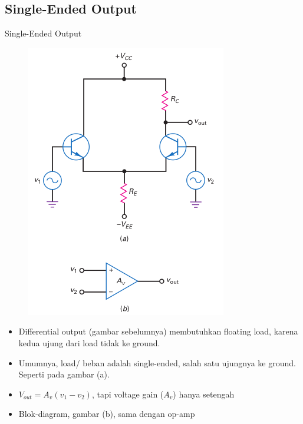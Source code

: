 \documentclass[aspectratio=169]{beamer}
\begin{document}
\subsection{Single-Ended Output}
\begin{frame}{Single-Ended Output}
	\begin{multicols}{2}
		\begin{figure}
			\centering
			\includegraphics[height=0.8\textheight]{gambar/01.diferential_input_single_ended}
		\end{figure}
		\columnbreak
		\begin{itemize}
			\item Differential output (gambar sebelumnya) membutuhkan floating load, karena kedua ujung dari load tidak ke ground.
			\item Umumnya, load/ beban adalah single-ended, salah satu ujungnya ke ground. Seperti pada gambar (a).
			\item $ V_{out} = A_v (v_1 - v_2) $, tapi voltage gain ($ A_v $) hanya setengah
			\item Blok-diagram, gambar (b), sama dengan op-amp
		\end{itemize}
	\end{multicols}
\end{frame}
\end{document}
